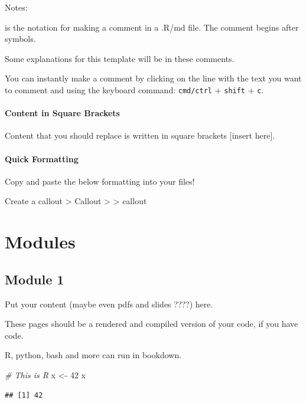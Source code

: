 \documentclass[
]{book}
\newenvironment{Shaded}{\begin{snugshade}}{\end{snugshade}}
\newcommand{\CommentTok}[1]{\textcolor[rgb]{0.56,0.35,0.01}{\textit{#1}}}
\newcommand{\DecValTok}[1]{\textcolor[rgb]{0.00,0.00,0.81}{#1}}
\newcommand{\NormalTok}[1]{#1}
\newcommand{\OtherTok}[1]{\textcolor[rgb]{0.56,0.35,0.01}{#1}}
\begin{document}
Notes:

is the notation for making a comment in a .R/md file. The comment begins after symbols.

Some explanations for this template will be in these comments.

You can instantly make a comment by clicking on the line with the text you want to comment and using the keyboard command: \texttt{cmd/ctrl} + \texttt{shift} + \texttt{c}.

\subsection{Content in Square Brackets}\label{content-in-square-brackets}

Content that you should replace is written in square brackets {[}insert here{]}.

\subsection{Quick Formatting}\label{quick-formatting}

Copy and paste the below formatting into your files!

Create a callout
\textgreater{} Callout
\textgreater{}
\textgreater{} callout

\part{Modules}\label{part-modules}

\chapter{Module 1}\label{module-1}

Put your content (maybe even pdfs and slides ????) here.

These pages should be a rendered and compiled version of your code, if you have code.

R, python, bash and more can run in bookdown.

\begin{Shaded}
\begin{Highlighting}[]
\CommentTok{\# This is R}
\NormalTok{x }\OtherTok{\textless{}{-}} \DecValTok{42}
\NormalTok{x}
\end{Highlighting}
\end{Shaded}

\begin{verbatim}
## [1] 42
\end{verbatim}
\end{document}
